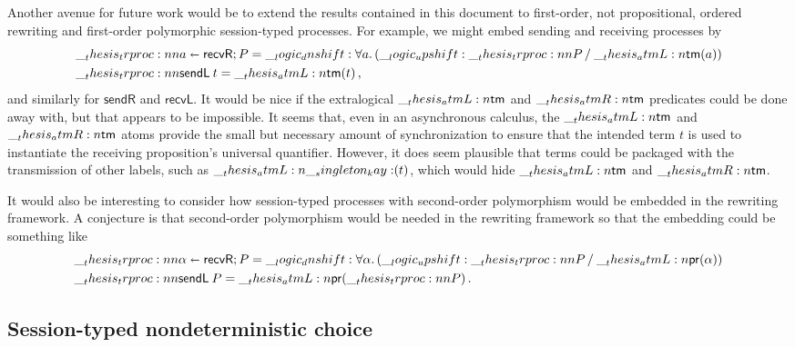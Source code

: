 Another avenue for future work would be to extend the results contained in this document to first-order, not propositional, ordered rewriting and first-order polymorphic session-typed processes.
For example, we might embed sending and receiving processes by 
\begin{equation*}
  \begin{lgathered}[t]
    \trproc{a \shortleftarrow \mathsf{recvR}; P} = \dn \forall a.\, (\up \trproc{P} \pmir \atmL{\mathsf{tm}}(a)) \\
    \trproc{\mathsf{sendL}\:t} = \atmL{\mathsf{tm}}(t)
  \,,
  \end{lgathered}
\end{equation*}
and similarly for $\mathsf{sendR}$ and $\mathsf{recvL}$.
It would be nice if the extralogical $\__thesis_atmL:n {\mathsf{tm}}$ and $\__thesis_atmR:n {\mathsf{tm}}$ predicates could be done away with, but that appears to be impossible.
It seems that, even in an asynchronous calculus, the $\__thesis_atmL:n {\mathsf{tm}}$ and $\__thesis_atmR:n {\mathsf{tm}}$ atoms provide the small but necessary amount of synchronization to ensure that the intended term $t$ is used to instantiate the receiving proposition's universal quantifier.
However, it does seem plausible that terms could be packaged with the transmission of other labels, such as $\__thesis_atmL:n {\__singleton_kay:}(t)$, which would hide  $\__thesis_atmL:n {\mathsf{tm}}$ and $\__thesis_atmR:n {\mathsf{tm}}$.

It would also be interesting to consider how session-typed processes with second-order polymorphism\autocite{??} would be embedded in the rewriting framework.
A conjecture is that second-order polymorphism would be needed in the rewriting framework so that the embedding could be something like 
\begin{equation*}
  \begin{lgathered}[t]
    \trproc{\alpha \shortleftarrow \mathsf{recvR}; P} = \dn \forall \alpha.\, (\up \trproc{P} \pmir \atmL{\mathsf{pr}}(\alpha)) \\
    \trproc{\mathsf{sendL}\:P} = \atmL{\mathsf{pr}}(\trproc{P})
  \,.
  \end{lgathered}
\end{equation*}


\subsection{Session-typed nondeterministic choice}

